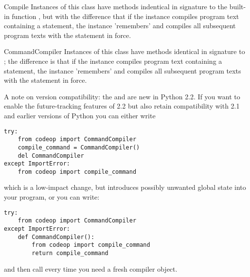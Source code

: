 \begin{classdesc}{Compile}{}
Instances of this class have  methods indentical in
signature to the built-in function , but with the
difference that if the instance compiles program text containing a
 statement, the instance 'remembers' and compiles
all subsequent program texts with the statement in force.
\end{classdesc}

\begin{classdesc}{CommandCompiler}{}
Instances of this class have  methods identical in
signature to ; the difference is that if
the instance compiles program text containing a 
statement, the instance 'remembers' and compiles all subsequent
program texts with the statement in force.
\end{classdesc}

A note on version compatibility: the  and
 are new in Python 2.2.  If you want to enable
the future-tracking features of 2.2 but also retain compatibility with
2.1 and earlier versions of Python you can either write

\begin{verbatim}
try:
    from codeop import CommandCompiler
    compile_command = CommandCompiler()
    del CommandCompiler
except ImportError:
    from codeop import compile_command
\end{verbatim}

which is a low-impact change, but introduces possibly unwanted global
state into your program, or you can write:

\begin{verbatim}
try:
    from codeop import CommandCompiler
except ImportError:
    def CommandCompiler():
        from codeop import compile_command
        return compile_command
\end{verbatim}

and then call  every time you need a fresh
compiler object.

